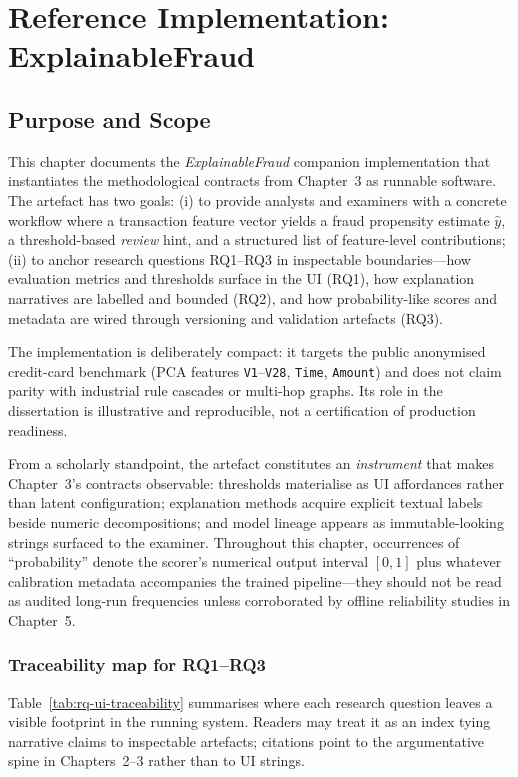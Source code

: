 \chapter{Reference Implementation: ExplainableFraud}

\section{Purpose and Scope}
This chapter documents the \emph{ExplainableFraud} companion implementation that instantiates the methodological contracts from Chapter~3 as runnable software. The artefact has two goals: (i) to provide analysts and examiners with a concrete workflow where a transaction feature vector yields a fraud propensity estimate $\hat{y}$, a threshold-based \emph{review} hint, and a structured list of feature-level contributions; (ii) to anchor research questions RQ1--RQ3 in inspectable boundaries---how evaluation metrics and thresholds surface in the UI (RQ1), how explanation narratives are labelled and bounded (RQ2), and how probability-like scores and metadata are wired through versioning and validation artefacts (RQ3).

The implementation is deliberately compact: it targets the public anonymised credit-card benchmark (PCA features \texttt{V1}--\texttt{V28}, \texttt{Time}, \texttt{Amount}) and does not claim parity with industrial rule cascades or multi-hop graphs. Its role in the dissertation is illustrative and reproducible, not a certification of production readiness.

From a scholarly standpoint, the artefact constitutes an \emph{instrument} that makes Chapter~3's contracts observable: thresholds materialise as UI affordances rather than latent configuration; explanation methods acquire explicit textual labels beside numeric decompositions; and model lineage appears as immutable-looking strings surfaced to the examiner. Throughout this chapter, occurrences of ``probability'' denote the scorer's numerical output interval $[0,1]$ plus whatever calibration metadata accompanies the trained pipeline—they should not be read as audited long-run frequencies unless corroborated by offline reliability studies in Chapter~5.

\subsection*{Traceability map for RQ1--RQ3}
Table~\ref{tab:rq-ui-traceability} summarises where each research question leaves a visible footprint in the running system. Readers may treat it as an index tying narrative claims to inspectable artefacts; citations point to the argumentative spine in Chapters~2--3 rather than to UI strings.

